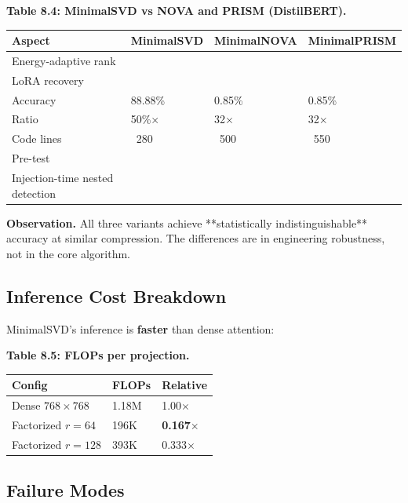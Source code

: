 \textbf{Table 8.4: MinimalSVD vs NOVA and PRISM (DistilBERT).}

\begin{table}[H]
\centering
\small
\begin{tabular}{llll}
\toprule
\textbf{Aspect} & \textbf{MinimalSVD} & \textbf{MinimalNOVA} & \textbf{MinimalPRISM} \\
\midrule
Energy-adaptive rank &  &  &  \\
LoRA recovery &  &  &  \\
Accuracy & 88.88\% & 0.85\% & 0.85\% \\
Ratio & 50\%$\times$ & 32$\times$ & 32$\times$ \\
Code lines & ~280 & ~500 & ~550 \\
Pre-test &  &  &  \\
Injection-time nested detection &  &  &  \\
\bottomrule
\end{tabular}
\end{table}

\textbf{Observation.} All three variants achieve **statistically 
indistinguishable** accuracy at similar compression. The differences are 
in engineering robustness, not in the core algorithm.

\subsection{Inference Cost Breakdown}

MinimalSVD's inference is \textbf{faster} than dense attention:

\textbf{Table 8.5: FLOPs per projection.}

\begin{table}[H]
\centering
\small
\begin{tabular}{lll}
\toprule
\textbf{Config} & \textbf{FLOPs} & \textbf{Relative} \\
\midrule
Dense $768 \times 768$ & 1.18M & 1.00$\times$ \\
Factorized $r=64$ & 196K & \textbf{0.167$\times$} \\
Factorized $r=128$ & 393K & 0.333$\times$ \\
\bottomrule
\end{tabular}
\end{table}

\subsection{Failure Modes}

